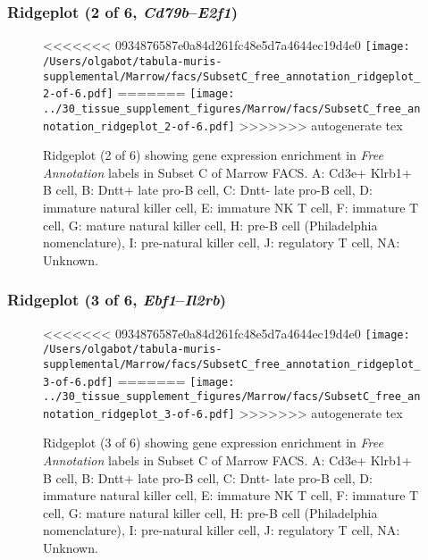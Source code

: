 \subsubsection{Ridgeplot (2 of 6, \emph{Cd79b}--\emph{E2f1})}
\begin{figure}[h]
\centering
<<<<<<< 0934876587e0a84d261fc48e5d7a4644ec19d4e0
\texttt{[image: /Users/olgabot/tabula-muris-supplemental/Marrow/facs/SubsetC\_free\_annotation\_ridgeplot\_2-of-6.pdf]}
=======
\texttt{[image: ../30\_tissue\_supplement\_figures/Marrow/facs/SubsetC\_free\_annotation\_ridgeplot\_2-of-6.pdf]}
>>>>>>> autogenerate tex

\caption{ Ridgeplot (2 of 6)  showing gene expression enrichment in \emph{Free Annotation} labels in Subset C of Marrow FACS. A: Cd3e+ Klrb1+ B cell, B: Dntt+ late pro-B cell, C: Dntt- late pro-B cell, D: immature natural killer cell, E: immature NK T cell, F: immature T cell, G: mature natural killer cell, H: pre-B cell (Philadelphia nomenclature), I: pre-natural killer cell, J: regulatory T cell, NA: Unknown.}
\end{figure}


\clearpage

\subsubsection{Ridgeplot (3 of 6, \emph{Ebf1}--\emph{Il2rb})}
\begin{figure}[h]
\centering
<<<<<<< 0934876587e0a84d261fc48e5d7a4644ec19d4e0
\texttt{[image: /Users/olgabot/tabula-muris-supplemental/Marrow/facs/SubsetC\_free\_annotation\_ridgeplot\_3-of-6.pdf]}
=======
\texttt{[image: ../30\_tissue\_supplement\_figures/Marrow/facs/SubsetC\_free\_annotation\_ridgeplot\_3-of-6.pdf]}
>>>>>>> autogenerate tex

\caption{ Ridgeplot (3 of 6)  showing gene expression enrichment in \emph{Free Annotation} labels in Subset C of Marrow FACS. A: Cd3e+ Klrb1+ B cell, B: Dntt+ late pro-B cell, C: Dntt- late pro-B cell, D: immature natural killer cell, E: immature NK T cell, F: immature T cell, G: mature natural killer cell, H: pre-B cell (Philadelphia nomenclature), I: pre-natural killer cell, J: regulatory T cell, NA: Unknown.}
\end{figure}


\clearpage

